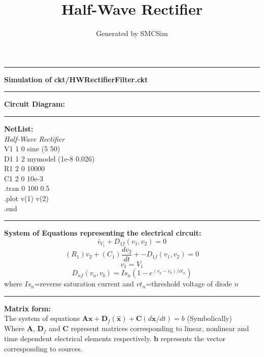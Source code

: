 \documentclass[a4paper,10pt]{report}
\title{Half-Wave Rectifier}
\author{Generated by SMCSim}
\begin{document}
\maketitle
\hrule\vspace{5mm}
\begin{center} {\bf Simulation of ckt/HWRectifierFilter.ckt} \end{center}
\hrule\vspace{5mm}

{\bf Circuit Diagram:} \\
\vspace{2mm}
\hrule\vspace{5mm}

{\bf NetList:} \\
{\it * Half-Wave Rectifier} \\
V1 1 0 sine (5 50) \\
D1 1 2 mymodel (1e-8 0.026) \\
R1 2 0 10000 \\
C1 2 0 10e-3 \\
.tran 0 100 0.5 \\
.plot v(1) v(2) \\
.end 
\vspace{2mm}
\hrule\vspace{5mm}

{\bf System of Equations representing the electrical circuit:}
\vspace{2mm}
\begin{equation}
     i_{V_1} + D_{1f}(v_1,v_2) = 0 
\end{equation}
\begin{equation}
     (R_1)v_2 + (C_1)\frac{dv_2}{dt} + -D_{1f}(v_1,v_2) = 0 
\end{equation}
\begin{equation}
     v_1 = V_1
\end{equation}
\vspace{2mm}
$$ D_{nf}(v_a,v_b)=Is_n(1-e^{(v_a-v_b)/vt_n})$$
 where $Is_n$=reverse saturation current and $vt_n$=threshold voltage of diode $n$\\
\hrule\vspace{5mm}

{\bf Matrix form:}\\
The system of equations $\mathbf{A}\mathbf{x}+\mathbf{D}_f(\mathbf{\widehat{x}})+\mathbf{C}(d\mathbf{x}/dt)=b$ (Symbolically)\\
Where $\mathbf{A}$, $\mathbf{D}_f$ and $\mathbf{C}$ represent matrices corresponding to linear,
  nonlinear and time dependent electrical elements respectively.
  $\mathbf{b}$ represents the vector corresponding to sources.
\end{document}
